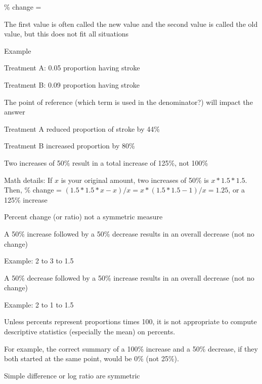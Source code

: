 \beq
 \% \textrm{ change } =  
\eeq
\item The first value is often called the new value and the second value is called the old value, but this does not fit all situations
\item   Example
  \bi
  \item      Treatment A: 0.05 proportion having stroke
  \item      Treatment B: 0.09 proportion having stroke
  \ei
\item The point of reference (which term is used in the denominator?) will impact the answer
  \bi
   \item      Treatment A reduced proportion of stroke by 44\%
   \item      Treatment B increased proportion by 80\%
  \ei
\item   Two increases of 50\% result in a total increase of 125\%, not 100\%
  \bi
   \item Math details: If $x$ is your original amount, two increases of 50\% is $x*1.5*1.5$. Then, \% change = $(1.5*1.5* x - x) / x = x*(1.5*1.5 - 1) / x = 1.25$, or a 125\% increase
  \ei
\item   Percent change (or ratio) not a symmetric measure
  \bi
  \item A 50\% increase followed by a 50\% decrease results in an overall decrease (not no change)
   \bi
    \item Example: 2 to 3 to 1.5
   \ei
  \item A 50\% decrease followed by a 50\% increase results in an overall decrease (not no change)
   \bi
   \item Example: 2 to 1 to 1.5
   \ei
  \ei
\item Unless percents represent proportions times 100, it is not appropriate to compute descriptive statistics (especially the mean) on percents.
  \bi
    \item For example, the correct summary of a 100\% increase and a 50\% decrease, if they both started at the same point, would be 0\% (not 25\%).
  \ei
\item   Simple difference or log ratio are symmetric
\ei

